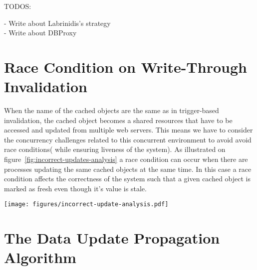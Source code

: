 TODOS:

- Write about Labrinidis's strategy \\
- Write about DBProxy



\section{Race Condition on Write-Through Invalidation}
\label{sec:race-condition-on-write-through-invalidation}

When the name of the cached objects are the same as in trigger-based invalidation, the cached object becomes a shared resources that have to be accessed and updated from multiple web servers. This means we have to consider the concurrency challenges related to this concurrent environment to avoid avoid race conditions( while ensuring liveness of the system).
As illustrated on figure~\ref{fig:incorrect-updates-analysis} a race condition can occur when there are processes updating the same cached objects at the same time. In this case a race condition affects the correctness of the system such that a given cached object is marked as fresh even though it's value is stale.

\begin{figure*}[ht!]
  \centering
  \texttt{[image: figures/incorrect-update-analysis.pdf]}
  \caption{Showing how two concurrent caching updates from two different application servers results in an inconsistent state. We see that even though the request from \emph{Update Process 2} are based on data older than \emph{Update Process 1} it gets to write }
  \label{fig:incorrect-updates-analysis}
\end{figure*}


\section{The Data Update Propagation Algorithm}
\label{sec:the-data-update-propagation-algorithm}

